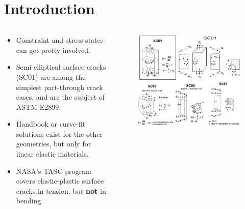 \part{Introduction}

\begin{frame}
\begin{columns}
\begin{column}{0.45\textwidth}
\begin{itemize}
\item Constraint and stress states can get pretty involved.
\item Semi-elliptical surface cracks (SC01) are among the simplest part-through crack cases, and are the subject of ASTM E2899.
\item Handbook or curve-fit solutions exist for the other geometries, but only for linear elastic materials.
\item NASA's TASC program covers elastic-plastic surface cracks in tension, but {\bfseries not} in bending.
\end{itemize}
\end{column}
\begin{column}{0.45\textwidth}
\begin{figure}[tbp]
\centering
\includegraphics[width=\columnwidth]{nasgro-geometries}
\end{figure}
\end{column}
\end{columns}

\note{
\vfill
}
\end{frame}

